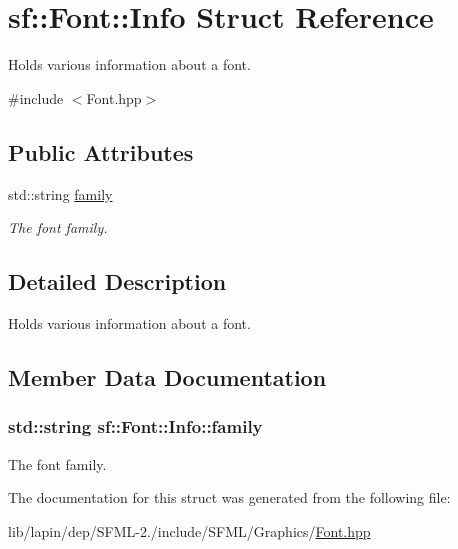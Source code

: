 \hypertarget{structsf_1_1_font_1_1_info}{\section{sf\-:\-:Font\-:\-:Info Struct Reference}
\label{structsf_1_1_font_1_1_info}
}


Holds various information about a font.  




{\ttfamily \#include $<$Font.\-hpp$>$}

\subsection*{Public Attributes}
\begin{DoxyCompactItemize}
\item 
std\-::string \hyperlink{structsf_1_1_font_1_1_info_a008413b4b6cf621eb92668a11098a519}{family}
\begin{DoxyCompactList}\small\item\em The font family. \end{DoxyCompactList}\end{DoxyCompactItemize}


\subsection{Detailed Description}
Holds various information about a font. 

\subsection{Member Data Documentation}
\hypertarget{structsf_1_1_font_1_1_info_a008413b4b6cf621eb92668a11098a519}{
\subsubsection[{family}]{\setlength{\rightskip}{0pt plus 5cm}std\-::string sf\-::\-Font\-::\-Info\-::family}}\label{structsf_1_1_font_1_1_info_a008413b4b6cf621eb92668a11098a519}


The font family. 



The documentation for this struct was generated from the following file\-:\begin{DoxyCompactItemize}
\item 
lib/lapin/dep/\-S\-F\-M\-L-\/2./include/\-S\-F\-M\-L/\-Graphics/\hyperlink{lapin_2dep_2_s_f_m_l-2_83_2include_2_s_f_m_l_2_graphics_2_font_8hpp}{Font.\-hpp}\end{DoxyCompactItemize}
